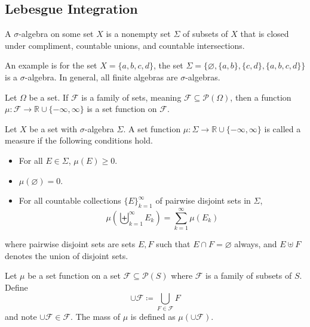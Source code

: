 \documentclass[12pt, letterpaper]{report}
\begin{document}
\subsection{Lebesgue Integration}
\begin{definition}
    A \(\sigma \)-algebra on some set \(X\) is a nonempty set \(\Sigma \) of subsets of \(X\) that is closed under compliment, countable unions, and countable intersections.
\end{definition}	
An example is for the set \(X=\{ a,b,c,d \} \), the set \(\Sigma =\{ \varnothing ,\{ a,b \},\{ c,d \},\{ a,b,c,d \}    \} \) is a \(\sigma \)-algebra. In general, all finite algebras are \(\sigma \)-algebras.
\begin{definition}
    Let \(\Omega \) be a set. If \(\mathcal{F} \) is a family of sets, meaning \(\mathcal{F} \subseteq \mathcal{P} (\Omega )\), then a function \(\mu :\mathcal{F} \to \mathbb{R} \cup \{ -\infty,\infty \} \) is a set function on \(\mathcal{F} \).
\end{definition} 
\begin{definition}[Measure]
    Let \(X\) be a set with \(\sigma \)-algebra \(\Sigma \). A set function \(\mu :\Sigma \to \mathbb{R} \cup \{ -\infty,\infty \} \) is called a measure if the following conditions hold.
    \begin{itemize}
        \item For all \(E\in \Sigma \), \(\mu (E)\geq 0\).
        \item \(\mu (\varnothing )=0\).
        \item For all countable collections \(\{ E \}_{k=1}^\infty \) of pairwise disjoint sets in \(\Sigma \),
        \[
            \mu \left( \biguplus_{k=1}^{\infty}E_k  \right) =\sum_{k=1}^\infty \mu \left( E_k \right)  
        \]
    \end{itemize}
    where pairwise disjoint sets are sets \(E,F\) such that \(E\cap F=\varnothing \) always, and \(E\uplus F\) denotes the union of disjoint sets.
\end{definition}
\begin{definition}
    Let \(\mu \) be a set function on a set \(\mathcal{F} \subseteq \mathcal{P} (S)\) where \(\mathcal{F} \) is a family of subsets of \(S \). Define
    \[
        \cup \mathcal{F} \coloneqq \bigcup_{F\in\mathcal{F} } F 
    \]
    and note \(\cup \mathcal{F} \in \mathcal{F} \). The mass of \(\mu \) is defined as \(\mu (\cup \mathcal{F} )\).
\end{definition}
\end{document}
